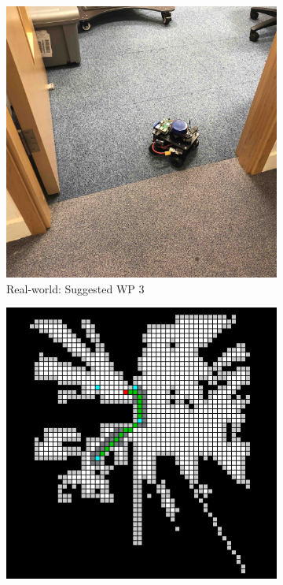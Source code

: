 \begin{figure}[htb]
  \begin{subfigure}[b]{0.32\linewidth}
    \includegraphics[width=\linewidth]{images/real/robo/5.JPG}
     \caption{Real-world: Suggested WP 3}
  \end{subfigure}
  \hfill
  \begin{subfigure}[b]{0.32\linewidth}
    \includegraphics[width=\linewidth]{images/real/sys/5_2.png}

\end{subfigure}
\end{figure}
